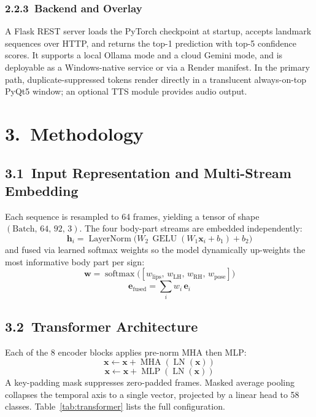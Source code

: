 \documentclass[10pt, twocolumn]{article}
\begin{document}
\subsubsection*{2.2.3~Backend and Overlay}
A Flask REST server loads the PyTorch checkpoint at startup, accepts landmark sequences over HTTP, and returns the top-1 prediction with top-5 confidence scores. It supports a local Ollama mode and a cloud Gemini mode, and is deployable as a Windows-native service or via a Render manifest. In the primary path, duplicate-suppressed tokens render directly in a translucent always-on-top PyQt5 window; an optional TTS module provides audio output.

\section*{3.~Methodology}

\subsection*{3.1~Input Representation and Multi-Stream Embedding}
Each sequence is resampled to 64 frames, yielding a tensor of shape $(\text{Batch},\,64,\,92,\,3)$. The four body-part streams are embedded independently:
\[
  \mathbf{h}_i = \operatorname{LayerNorm}\!\bigl(W_2\,\operatorname{GELU}(W_1\mathbf{x}_i+b_1)+b_2\bigr)
\]
and fused via learned softmax weights so the model dynamically up-weights the most informative body part per sign:
\[
  \mathbf{w} = \operatorname{softmax}\!\bigl([w_\text{lips},\,w_\text{LH},\,w_\text{RH},\,w_\text{pose}]\bigr)
\]
\[
  \mathbf{e}_\text{fused} = \textstyle\sum_i w_i\,\mathbf{e}_i
\]

\subsection*{3.2~Transformer Architecture}

Each of the 8 encoder blocks applies pre-norm MHA then MLP:
\[
  \mathbf{x} \leftarrow \mathbf{x}+\operatorname{MHA}(\operatorname{LN}(\mathbf{x}))
\]
\[
  \mathbf{x} \leftarrow \mathbf{x}+\operatorname{MLP}(\operatorname{LN}(\mathbf{x}))
\]
A key-padding mask suppresses zero-padded frames. Masked average pooling collapses the temporal axis to a single vector, projected by a linear head to 58 classes. Table~\ref{tab:transformer} lists the full configuration.
\end{document}
